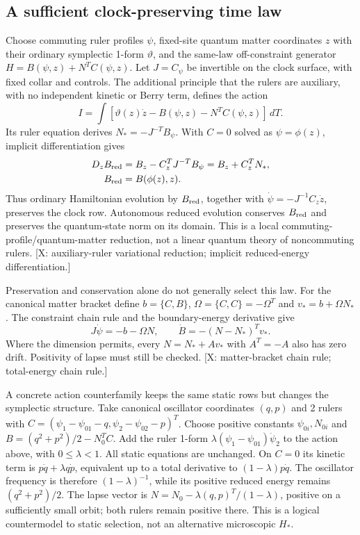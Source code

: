 \subsection*{A sufficient clock-preserving time law}
Choose commuting ruler profiles $\psi$, fixed-site quantum matter
coordinates $z$ with their ordinary symplectic 1-form $\vartheta$,
and the same-law off-constraint generator
$H=B(\psi,z)+N^TC(\psi,z)$.
Let $J=C_\psi$ be invertible on the clock surface, with fixed collar
and controls.
The additional principle that the rulers are auxiliary, with no
independent kinetic or Berry term, defines the action
\[
 I=\int[\vartheta(z)\dot z-B(\psi,z)-N^TC(\psi,z)]\,dT .
\]
Its ruler equation derives $N_*=-J^{-T}B_\psi$.
With $C=0$ solved as $\psi=\phi(z)$, implicit differentiation gives
\[
 \begin{aligned}
 D_zB_{\rm red}&=B_z-C_z^TJ^{-T}B_\psi
               =B_z+C_z^TN_*,\\
 B_{\rm red}&=B(\phi(z),z).
 \end{aligned}
\]
Thus ordinary Hamiltonian evolution by $B_{\rm red}$, together with
$\dot\psi=-J^{-1}C_z\dot z$, preserves the clock row.
Autonomous reduced evolution conserves $B_{\rm red}$ and preserves
the quantum-state norm on its domain.
This is a local commuting-profile/quantum-matter reduction, not a
linear quantum theory of noncommuting rulers.
[X: auxiliary-ruler variational reduction; implicit reduced-energy
differentiation.]

Preservation and conservation alone do not generally select this law.
For the canonical matter bracket define
$b=\{C,B\}$, $\Omega=\{C,C\}=-\Omega^T$ and
$v_*=b+\Omega N_*$.
The constraint chain rule and the boundary-energy derivative give
\[
 J\dot\psi=-b-\Omega N,\qquad
 \dot B=-(N-N_*)^Tv_* .
\]
Where the dimension permits, every $N=N_*+Av_*$ with
$A^T=-A$ also has zero drift.
Positivity of lapse must still be checked.
[X: matter-bracket chain rule; total-energy chain rule.]

A concrete action counterfamily keeps the same static rows but
changes the symplectic structure.
Take canonical oscillator coordinates $(q,p)$ and 2 rulers with
$C=(\psi_1-\psi_{01}-q,\psi_2-\psi_{02}-p)^T$.
Choose positive constants $\psi_{0i},N_{0i}$ and
$B=(q^2+p^2)/2-N_0^TC$.
Add the ruler 1-form $\lambda(\psi_1-\psi_{01})\dot\psi_2$ to
the action above, with $0\le\lambda<1$.
All static equations are unchanged.
On $C=0$ its kinetic term is
$p\dot q+\lambda q\dot p$, equivalent up to a total derivative to
$(1-\lambda)p\dot q$.
The oscillator frequency is therefore $(1-\lambda)^{-1}$, while
its positive reduced energy remains $(q^2+p^2)/2$.
The lapse vector is $N=N_0-\lambda(q,p)^T/(1-\lambda)$, positive
on a sufficiently small orbit; both rulers remain positive there.
This is a logical countermodel to static selection, not an
alternative microscopic $H_*$.

